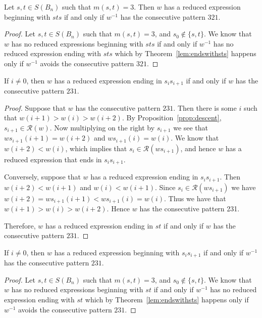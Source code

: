 \begin{corollary}\label{lem:endswithsts}
	Let $s,t \in S(B_n)$ such that $m(s,t)=3$. Then $w$ has a reduced expression beginning with $sts$ if and only if $w^{-1}$ has the consecutive pattern $321$.
	\begin{proof}
		Let $s,t \in S(B_n)$ such that $m(s,t)=3$, and $s_0 \notin\{s,t\}$. We know that $w$ has no reduced expressions beginning with $sts$ if and only if $w^{-1}$ has no reduced expression ending with $sts$ which by Theorem~\ref{lem:endswithsts} happens only if $w^{-1}$ avoids the consecutive pattern $321$.
	\end{proof}
\end{corollary}

\begin{lemma}\label{lem:ts}
If $i \neq 0$, then $w$ has a reduced expression ending in $s_is_{i+1}$ if and only if $w$ has the consecutive pattern $231$.
\begin{proof}	
	Suppose that $w$ has the consecutive pattern $231$. Then there is some $i$ such that $w(i+1)>w(i)>w(i+2)$. By Proposition~\ref{prop:descent}, $s_{i+1} \in \mathcal{R}(w)$. Now multiplying on the right by $s_{i+1}$ we see that $ws_{i+1}(i+1)=w(i+2)$ and $ws_{i+1}(i)=w(i)$. We know that $w(i+2)<w(i)$, which implies that $s_i \in \mathcal{R}(ws_{i+1})$, and hence $w$ has a reduced expression that ends in $s_is_{i+1}$.
	
	 Conversely, suppose that $w$ has a reduced expression ending in $s_is_{i+1}$. Then $w(i+2)<w(i+1)$ and $w(i)<w(i+1)$. Since $s_i \in \mathcal{R}(ws_{i+1})$ we have $w(i+2)=ws_{i+1}(i+1)<ws_{i+1}(i)=w(i)$. Thus we have that $w(i+1) > w(i) > w(i+2)$. Hence $w$ has the consecutive pattern 231.
	
	Therefore, $w$ has a reduced expression ending in $st$ if and only if $w$ has the consecutive pattern $231$.
\end{proof}	
\end{lemma}

\begin{corollary}\label{lem:endswithst}
	If $i \neq 0$, then $w$ has a reduced expression beginning with $s_is_{i+1}$ if and only if $w^{-1}$ has the consecutive pattern $231$.
	\begin{proof}
		Let $s,t \in S(B_n)$ such that $m(s,t)=3$, and $s_0 \notin\{s,t\}$. We know that $w$ has no reduced expressions beginning with $st$ if and only if $w^{-1}$ has no reduced expression ending with $st$ which by Theorem~\ref{lem:endswithsts} happens only if $w^{-1}$ avoids the consecutive pattern $231$.
	\end{proof}
\end{corollary}

